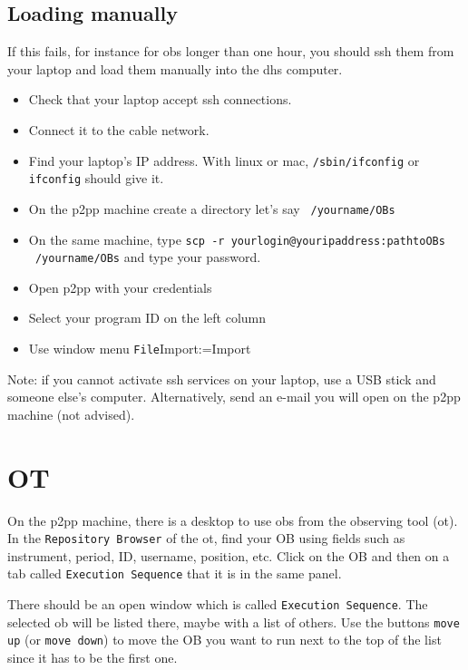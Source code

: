 \documentclass[11pt,fleqn,a4paper]{book}
\makeatletter
\def\menu#1#2{\texttt{#1}\ifx{}#2\else\@for\@x:=#2\do{$\rightarrow$\texttt{\@x}}\fi}
\def\wmenu#1#2{window menu \menu{#1}{#2}}
\makeatother
\begin{document}
\subsection{Loading manually}
If this fails, for instance for \glspl{ob} longer than one hour, you should
ssh them from your laptop and load them manually into the dhs computer.

\begin{itemize}
  \item Check that your laptop accept ssh connections.
  \item Connect it to the cable network.
  \item Find your laptop's IP address.  With linux or mac, 
        \texttt{/sbin/ifconfig} or \texttt{ifconfig} should give it.
  \item On the \gls{p2pp} machine create a directory let's say \texttt{~/yourname/OBs} 
  \item On the same machine, type \texttt{scp -r yourlogin@youripaddress:pathtoOBs ~/yourname/OBs}
        and type your password.
  \item Open \gls{p2pp} with your credentials
  \item Select your program ID on the left column
  \item Use \wmenu{File}{Import}
\end{itemize}

Note: if you cannot activate ssh services on your laptop, use a USB stick and someone else's computer.   Alternatively, send an e-mail you will open on the p2pp machine (not advised). 

\section{OT}

On the \gls{p2pp} machine, there is a \gls{desktop} to use \glspl{ob} from the observing tool (\gls{ot}). In the \texttt{Repository Browser} of the \gls{ot}, find your OB using fields such as instrument, period, ID, username, position, etc.  Click on the OB and then on a tab called \texttt{Execution Sequence} that it is in the same panel.

There should be an open window which is called \texttt{Execution Sequence}. The selected \gls{ob} will be listed there, maybe with a list of others. Use the buttons \texttt{move up} (or \texttt{move down})  to move the OB you want to run next to the top of the list since it has to be the first one.
\end{document}

